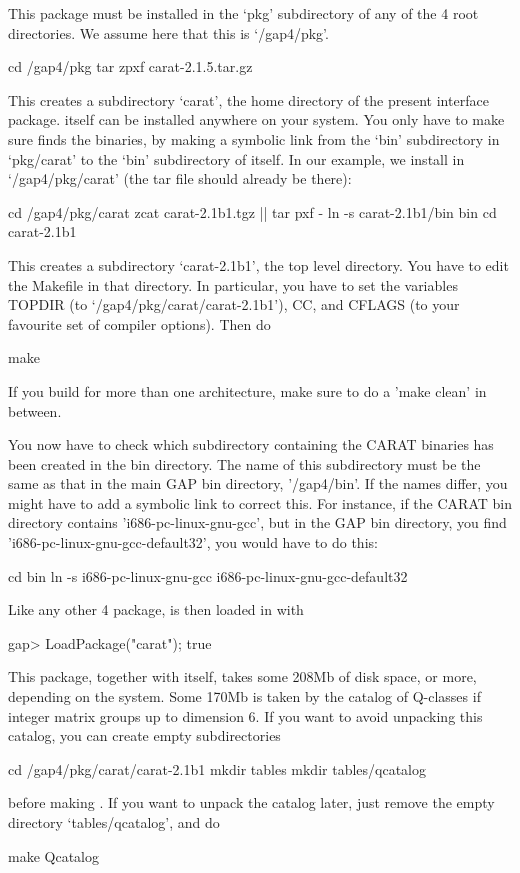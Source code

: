 
This package must be installed in the `pkg' subdirectory of any of
the {\GAP} 4 root directories. We assume here that this is `/gap4/pkg'.

\begintt
cd /gap4/pkg
tar zpxf carat-2.1.5.tar.gz
\endtt

This creates a subdirectory `carat', the home directory of the present
interface package. {\CARAT} itself can be installed anywhere on your 
system. You only have to make sure {\GAP} finds the {\CARAT} binaries, 
by making a symbolic link from the `bin' subdirectory in `pkg/carat' to 
the `bin' subdirectory of {\CARAT} itself. In our example, we install 
{\CARAT} in `/gap4/pkg/carat' (the {\CARAT} tar file should already be 
there):

\begintt
cd /gap4/pkg/carat
zcat carat-2.1b1.tgz || tar pxf -
ln -s carat-2.1b1/bin bin
cd carat-2.1b1
\endtt

This creates a subdirectory `carat-2.1b1', the {\CARAT} top level directory. 
You have to edit the Makefile in that directory. In particular, you have 
to set the variables TOPDIR (to `/gap4/pkg/carat/carat-2.1b1'), CC, and 
CFLAGS (to your favourite set of compiler options). Then do 

\begintt
make
\endtt

If you build for more than one architecture, make sure to do a 
'make clean' in between.

You now have to check which subdirectory containing the CARAT 
binaries has been created in the bin directory. The name of this
subdirectory must be the same as that in the main GAP bin directory,
'/gap4/bin'. If the names differ, you might have to add a symbolic
link to correct this. For instance, if the CARAT bin directory
contains 'i686-pc-linux-gnu-gcc', but in the GAP bin directory,
you find 'i686-pc-linux-gnu-gcc-default32', you would have to do this:

\begintt
cd bin
ln -s i686-pc-linux-gnu-gcc i686-pc-linux-gnu-gcc-default32
\endtt

Like any other {\GAP} 4 package, {\CARAT} is then loaded in {\GAP} with

\beginexample
gap> LoadPackage("carat");
true
\endexample

This package, together with {\CARAT} itself, takes some 208Mb of disk space,
or more, depending on the system. Some 170Mb is taken by the catalog
of Q-classes if integer matrix groups up to dimension 6. If you want
to avoid unpacking this catalog, you can create empty subdirectories

\begintt
cd /gap4/pkg/carat/carat-2.1b1
mkdir tables
mkdir tables/qcatalog
\endtt

before making {\CARAT}. If you want to unpack the catalog later, just
remove the empty directory `tables/qcatalog', and do

\begintt
make Qcatalog
\endtt

